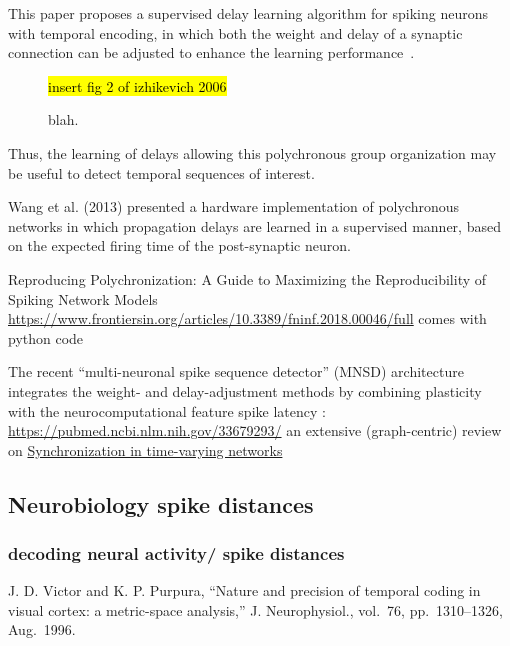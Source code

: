 \documentclass[brainsci, %
               review,submit,pdftex,moreauthors%
               ]{Definitions/mdpi}
\newcommand{\note}[1]{{\sethlcolor{yellow}\hl{#1}}}
\begin{document}
This paper proposes a supervised delay learning algorithm for spiking neurons with temporal encoding, in which both the weight and delay of a synaptic connection can be adjusted to enhance the learning performance~\citep{wang}.

\begin{figure}
\centering
\note{insert fig 2 of izhikevich 2006}
\caption{blah.}\label{fig:PG}
\end{figure}



Thus, the learning of delays allowing this polychronous group organization may be useful to detect temporal sequences of interest.


Wang et al. (2013) presented a hardware implementation of polychronous networks in which propagation delays are learned in a supervised manner, based on the expected firing time of the post-synaptic neuron.
 
Reproducing Polychronization: A Guide to Maximizing the Reproducibility of Spiking Network Models \url{https://www.frontiersin.org/articles/10.3389/fninf.2018.00046/full}     comes with python code

  
    The recent ``multi-neuronal spike sequence detector'' (MNSD) architecture integrates the weight- and delay-adjustment methods by combining plasticity with the neurocomputational feature spike latency : \url{https://pubmed.ncbi.nlm.nih.gov/33679293/}
    an extensive (graph-centric) review on \href{https://arxiv.org/abs/2109.07618}{Synchronization in time-varying networks}


\subsection{Neurobiology spike distances}
\subsubsection{decoding neural activity/ spike distances}

J. D. Victor and K. P. Purpura, ``Nature and precision of temporal coding in visual cortex: a metric-space analysis,'' J. Neurophysiol., vol.~76, pp.~1310--1326, Aug.~1996.
\end{document}
